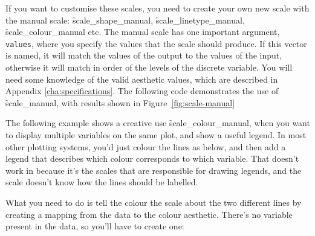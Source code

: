 If you want to customise these scales, you need to create your own new scale with the manual scale: \f{scale_shape_manual}, \f{scale_linetype_manual}, \f{scale_colour_manual} etc. The manual scale has one important argument, \verb|values|, where you specify the values that the scale should produce. If this vector is named, it will match the values of the output to the values of the input, otherwise it will match in order of the levels of the discrete variable. You will need some knowledge of the valid aesthetic values, which are described in Appendix \ref{cha:specifications}.  The following code demonstrates the use of \f{scale_manual}, with results shown in Figure~\ref{fig:scale-manual}

% 


The following example shows a creative use \f{scale_colour_manual}, when you want to display multiple variables on the same plot, and show a useful legend. In most other plotting systems, you'd just colour the lines as below, and then add a legend that describes which colour corresponds to which variable.  That doesn't work in \ggplot because it's the scales that are responsible for drawing legends, and the scale doesn't know how the lines should be labelled.

% 


What you need to do is tell the colour the scale about the two different lines by creating a mapping from the data to the colour aesthetic. There's no variable present in the data, so you'll have to create one:

% 


